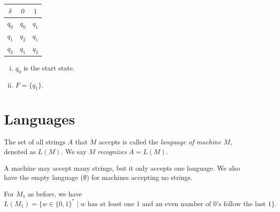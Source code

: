 \begin{center}
\begin{tabular}{c|c|c}
$\delta$ & $0$ & $1$ \\ \hline
$q_0$ & $q_0$ & $q_1$ \\
$q_1$ & $q_2$ & $q_1$ \\
$q_2$ & $q_1$ & $q_2$
\end{tabular}
\end{center}

\begin{enumerate}[(iv)]
    \item $q_0$ is the start state.
    \item $F = \{q_1\}$.
\end{enumerate}

\section{Languages}

The set of all strings $A$ that $M$ accepts is called the \emph{language of machine $M$}, denoted as $L(M)$. We say $M$ \emph{recognizes} $A = L(M)$.

A machine may accept many strings, but it only accepts one language. We also have the empty language ($\emptyset$) for machines accepting no strings.

\begin{example}
For $M_1$ as before, we have
\[
L(M_1) = \{ w \in \{0,1\}^* \mid w \text{ has at least one } 1 \text{ and an even number of } 0\text{'s follow the last } 1 \}.
\]
\end{example}

